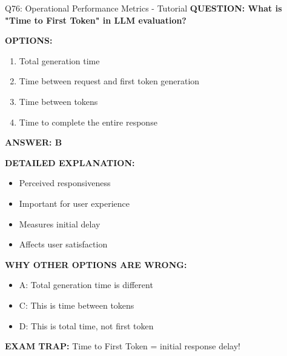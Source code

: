 \documentclass[8pt]{beamer}
\begin{document}
	\begin{frame}{Q76: Operational Performance Metrics - Tutorial}
		\fontsize{6.5}{7.5}\selectfont
		\textbf{QUESTION: What is "Time to First Token" in LLM evaluation?}
		
		\vspace{0.1cm}
		\textbf{OPTIONS:}
		\begin{enumerate}
			\item Total generation time
			\item Time between request and first token generation
			\item Time between tokens
			\item Time to complete the entire response
		\end{enumerate}
		
		\vspace{0.1cm}
		\textcolor{myblue}{\textbf{ANSWER: B}}
		
		\vspace{0.1cm}
		\textbf{DETAILED EXPLANATION:}
		\begin{itemize}
			\item Perceived responsiveness
			\item Important for user experience
			\item Measures initial delay
			\item Affects user satisfaction
		\end{itemize}
		
		\vspace{0.1cm}
		\textcolor{myred}{\textbf{WHY OTHER OPTIONS ARE WRONG:}}
		\begin{itemize}
			\item \textcolor{myred}{A:} Total generation time is different
			\item \textcolor{myred}{C:} This is time between tokens
			\item \textcolor{myred}{D:} This is total time, not first token
		\end{itemize}
		
		\textcolor{myred}{\textbf{EXAM TRAP:}} Time to First Token = \textcolor{myblue}{initial response delay}!
	\end{frame}
	
\end{document}
